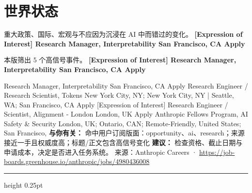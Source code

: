 \documentclass[10.5pt]{ctexart}
\begin{document}
\section*{世界状态}
{\color{ormuted} 重大政策、国际、宏观与不应因为沉浸在 AI 中而错过的变化。}
\vspace{2mm}
{\LARGE\bfseries [Expression of Interest] Research Manager, Interpretability San Francisco, CA Apply}\par
\vspace{1mm}
{\color{ormuted} 本版筛出 5 个高信号事件。}
\vspace{3mm}
{\Large\bfseries [Expression of Interest] Research Manager, Interpretability San Francisco, CA Apply}\par
[Expression of Interest] Research Manager, Interpretability San Francisco, CA Apply Research Engineer / Research Scientist, Tokens New York City, NY; New York City, NY | Seattle, WA; San Francisco, CA Apply [Expression of Interest] Research Engineer / Scientist, Alignment - London London, UK Apply Anthropic Fellows Program, AI Safety \& Security London, UK; Ontario, CAN; Remote-Friendly, United States; San Francisco, 
\textbf{与你有关：} 命中用户订阅版面：opportunity、ai、research；来源接近一手且权威度高；标题/正文包含高信号变化
\textbf{建议：} 检查资格、截止日期与申请成本，决定是否进入任务系统。
{\footnotesize\color{ormuted} 来源：Anthropic Careers · \url{https://job-boards.greenhouse.io/anthropic/jobs/4980436008}}
\vspace{4mm}
\hrule height 0.25pt
\vspace{3mm}
\end{document}
